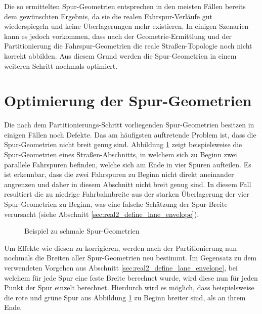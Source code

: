 Die so ermittelten Spur-Geometrien entsprechen in den meisten Fällen bereits dem gewünschten Ergebnis,
da sie die realen Fahrspur-Verläufe gut wiederspiegeln und keine Überlagerungen mehr existieren.
In einigen Szenarien kann es jedoch vorkommen, dass nach der Geometrie-Ermittlung und der Partitionierung
die Fahrspur-Geometrien die reale Straßen-Topologie noch nicht korrekt abbilden. Aus diesem Grund werden die
Spur-Geometrien in einem weiteren Schritt nochmals optimiert.

\section{Optimierung der Spur-Geometrien}

Die nach dem Partitionierungs-Schritt vorliegenden Spur-Geometrien besitzen in einigen Fällen noch Defekte.
Das am häufigsten auftretende Problem ist, dass die Spur-Geometrien nicht breit genug sind.
Abbildung \ref{fig:real2_pre_opt} zeigt beispielsweise die Spur-Geometrien eines Straßen-Abschnitts,
in welchem sich zu Beginn zwei parallele Fahrspuren befinden, welche sich am Ende in vier Spuren aufteilen.
Es ist erkennbar, dass die zwei Fahrspuren zu Beginn nicht direkt aneinander angrenzen
und daher in diesem Abschnitt nicht breit genug sind. In diesem Fall resultiert die zu niedrige Fahrbahnbreite
aus der starken Überlagerung der vier Spur-Geometrien zu Beginn, was eine falsche Schätzung der Spur-Breite verursacht
(siehe Abschnitt \ref{sec:real2_define_lane_envelope}).

\begin{figure}[H]
    \centering
    \caption{Beispiel zu schmale Spur-Geometrien}
    \label{fig:real2_pre_opt}
\end{figure}

Um Effekte wie diesen zu korrigieren, werden nach der Partitionierung nun nochmals die Breiten aller Spur-Geometrien
neu bestimmt. Im Gegensatz zu dem verwendeten Vorgehen aus Abschnitt \ref{sec:real2_define_lane_envelope},
bei welchem für jede Spur eine feste Breite berechnet wurde, wird diese nun für jeden Punkt der Spur einzelt
berechnet. Hierdurch wird es möglich, dass beispielsweise die rote und grüne Spur aus Abbildung \ref{fig:real2_pre_opt}
zu Beginn breiter sind, als an ihrem Ende.

